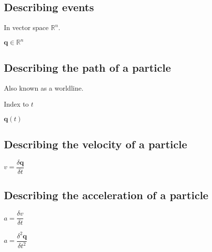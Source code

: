 
\subsection{Describing events}


In vector space \(\mathbb{R}^n\).

\(\mathbf{q} \in \mathbb{R}^n\)


\subsection{Describing the path of a particle}

Also known as a worldline.

Index to \(t\)

\(\mathbf{q} (t)\)

\subsection{Describing the velocity of a particle}

\(v=\dfrac{\delta \mathbf{q}}{\delta t}\)

\subsection{Describing the acceleration of a particle}


\(a=\dfrac{\delta v}{\delta t}\)

\(a=\dfrac{\delta^2 \mathbf{q}}{\delta t^2}\)

